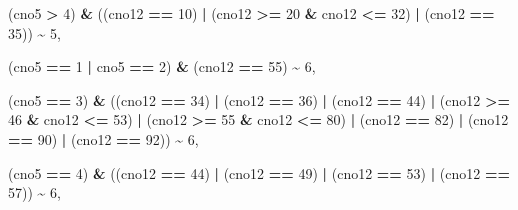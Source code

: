 \documentclass[
]{article}
\newenvironment{Shaded}{\begin{snugshade}}{\end{snugshade}}
\newcommand{\DecValTok}[1]{\textcolor[rgb]{0.00,0.00,0.81}{#1}}
\newcommand{\NormalTok}[1]{#1}
\newcommand{\SpecialCharTok}[1]{\textcolor[rgb]{0.81,0.36,0.00}{\textbf{#1}}}
\begin{document}
\begin{Shaded}
\begin{Highlighting}[]
\NormalTok{                        (cno5 }\SpecialCharTok{\textgreater{}} \DecValTok{4}\NormalTok{) }\SpecialCharTok{\&}\NormalTok{ ((cno12 }\SpecialCharTok{==} \DecValTok{10}\NormalTok{) }\SpecialCharTok{|}\NormalTok{ (cno12 }\SpecialCharTok{\textgreater{}=} \DecValTok{20} \SpecialCharTok{\&}\NormalTok{ cno12 }\SpecialCharTok{\textless{}=} \DecValTok{32}\NormalTok{) }\SpecialCharTok{|}\NormalTok{ (cno12 }\SpecialCharTok{==} \DecValTok{35}\NormalTok{)) }\SpecialCharTok{\textasciitilde{}} \DecValTok{5}\NormalTok{,}
                        
\NormalTok{                        (cno5 }\SpecialCharTok{==} \DecValTok{1} \SpecialCharTok{|}\NormalTok{ cno5 }\SpecialCharTok{==} \DecValTok{2}\NormalTok{) }\SpecialCharTok{\&}\NormalTok{ (cno12 }\SpecialCharTok{==} \DecValTok{55}\NormalTok{) }\SpecialCharTok{\textasciitilde{}} \DecValTok{6}\NormalTok{,}
                        
\NormalTok{                        (cno5 }\SpecialCharTok{==} \DecValTok{3}\NormalTok{) }\SpecialCharTok{\&}\NormalTok{ ((cno12 }\SpecialCharTok{==} \DecValTok{34}\NormalTok{) }\SpecialCharTok{|}\NormalTok{ (cno12 }\SpecialCharTok{==} \DecValTok{36}\NormalTok{) }\SpecialCharTok{|}\NormalTok{ (cno12 }\SpecialCharTok{==} \DecValTok{44}\NormalTok{) }\SpecialCharTok{|} 
\NormalTok{                        (cno12 }\SpecialCharTok{\textgreater{}=} \DecValTok{46} \SpecialCharTok{\&}\NormalTok{ cno12 }\SpecialCharTok{\textless{}=} \DecValTok{53}\NormalTok{) }\SpecialCharTok{|}\NormalTok{ (cno12 }\SpecialCharTok{\textgreater{}=} \DecValTok{55} \SpecialCharTok{\&}\NormalTok{ cno12 }\SpecialCharTok{\textless{}=} \DecValTok{80}\NormalTok{) }\SpecialCharTok{|} 
\NormalTok{                        (cno12 }\SpecialCharTok{==} \DecValTok{82}\NormalTok{) }\SpecialCharTok{|}\NormalTok{ (cno12 }\SpecialCharTok{==} \DecValTok{90}\NormalTok{) }\SpecialCharTok{|}\NormalTok{ (cno12 }\SpecialCharTok{==} \DecValTok{92}\NormalTok{)) }\SpecialCharTok{\textasciitilde{}} \DecValTok{6}\NormalTok{,}
                        
\NormalTok{                        (cno5 }\SpecialCharTok{==} \DecValTok{4}\NormalTok{) }\SpecialCharTok{\&}\NormalTok{ ((cno12 }\SpecialCharTok{==} \DecValTok{44}\NormalTok{) }\SpecialCharTok{|}\NormalTok{ (cno12 }\SpecialCharTok{==} \DecValTok{49}\NormalTok{) }\SpecialCharTok{|}\NormalTok{ (cno12 }\SpecialCharTok{==} \DecValTok{53}\NormalTok{) }\SpecialCharTok{|}\NormalTok{ (cno12 }\SpecialCharTok{==} \DecValTok{57}\NormalTok{)) }\SpecialCharTok{\textasciitilde{}} \DecValTok{6}\NormalTok{,}
                        

\end{Highlighting}
\end{Shaded}
\end{document}
